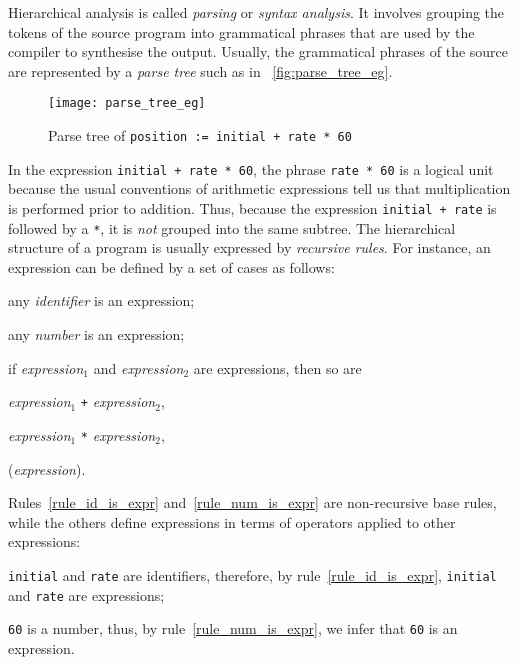 Hierarchical analysis is called \emph{parsing} or \emph{syntax
analysis}. It involves grouping the tokens of the source program into
grammatical phrases that are used by the compiler to synthesise the
output. Usually, the grammatical phrases of the source are represented
by a \emph{parse tree} such as in \fig~\vref{fig:parse_tree_eg}.
\begin{figure}
\centering
\texttt{[image: parse\_tree\_eg]}
\caption{Parse tree of \texttt{position := initial + rate * 60}\label{fig:parse_tree_eg}}
\end{figure}
In the expression \texttt{initial + rate * 60}, the phrase
\texttt{rate * 60} is a logical unit because the usual conventions of
arithmetic expressions tell us that multiplication is performed prior
to addition. Thus, because the expression \texttt{initial + rate} is
followed by a \verb+*+, it is \emph{not} grouped into the same
subtree. The hierarchical structure of a program is usually expressed
by \emph{recursive rules}. For instance, an expression can be defined
by a set of cases as follows:
\begin{enumerate*}

  \item any \emph{identifier} is an expression;\label{rule_id_is_expr}

  \item any \emph{number} is an expression;\label{rule_num_is_expr}

  \item if \emph{expression}\(_1\) and \emph{expression}\(_2\) are
  expressions, then so are
   \begin{enumerate*}
 
     \item \emph{expression}\(_1\) \verb|+|
       \emph{expression}\(_2\), \label{rule_add_is_expr}

     \item \emph{expression}\(_1\) \verb|*|
       \emph{expression}\(_2\), \label{rule_mult_is_expr}

     \item (\emph{expression}).

   \end{enumerate*}

\end{enumerate*}
Rules~\ref{rule_id_is_expr} and~\ref{rule_num_is_expr} are
non-recursive base rules, while the others define expressions in terms
of operators applied to other expressions:
\begin{itemize*}

  \item \texttt{initial} and \texttt{rate} are identifiers, therefore,
  by rule~\ref{rule_id_is_expr}, \texttt{initial} and \texttt{rate}
  are expressions;

  \item \texttt{60} is a number, thus, by rule~\ref{rule_num_is_expr},
    we infer that \texttt{60} is an expression.

\end{itemize*}
